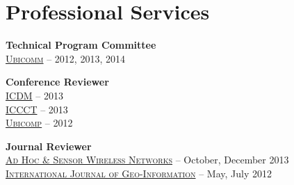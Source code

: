 \section{\sc Professional Services}
{\bf Technical Program Committee}\\
{\href{http://www.iaria.org/conferences.html}{\textsc{Ubicomm}}} -- 2012, 2013, 2014

{\bf Conference Reviewer}\\
{\href{http://icdm2013.rutgers.edu}{\textsc{ICDM}}} -- 2013\\
{\href{http://www.mnnit.ac.in/iccct2013}{\textsc{ICCCT}}} -- 2013\\
{\href{http://www.ubicomp.org/ubicomp2012}{\textsc{Ubicomp}}} -- 2012

{\bf Journal Reviewer}\\
{\href{http://www.oldcitypublishing.com/AHSWN/AHSWN.html}{\textsc{Ad Hoc \& Sensor Wireless Networks}}} -- October, December 2013\\
{\href{http://www.mdpi.com/journal/ijgi}{\textsc{International Journal of Geo-Information}}} -- May, July 2012
